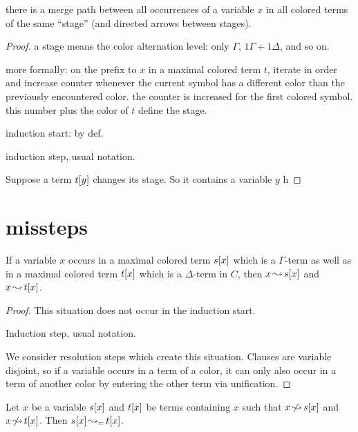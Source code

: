 \documentclass[,%
	paper=a4,%
	DIV11, %
	twoside=false,%
	liststotoc,
	bibtotoc,
	draft=false,%
	numbers=noendperiod
]{scrartcl}
\begin{document}
\begin{clemma}
	there is a merge path between all occurrences of a variable $x$ in all colored terms of the same ``stage'' (and directed arrows between stages).
\end{clemma}
\begin{proof}
	a stage means the color alternation level: only $\Gamma$, $1 \Gamma + 1 \Delta$, and so on.

	more formally: on the prefix to $x$ in a maximal colored term $t$, iterate in order and increase counter whenever the current symbol has a different color than the previously encountered color. the counter is increased for the first colored symbol. this number plus the color of $t$ define the stage.

	induction start: by def.

	induction step, usual notation.

	Suppose a term $t[y]$ changes its stage. 
	So it contains a variable $y$ h





\end{proof}



\section{missteps}
\begin{clemma}
	\label{lemma:arrow_from_one_color_to_other_color}
	If a variable $x$ occurs in a maximal colored term $s[x]$ which is a $\Gamma$-term as well as in a maximal colored term $t[x]$ which is a $\Delta$-term in $C$, then $x\operatorname{\leadsto} s[x]$ and $x\operatorname{\leadsto} t[x]$.
\end{clemma}
\begin{proof}
	This situation does not occur in the induction start.

	Induction step, usual notation.

	We consider resolution steps which create this situation. 
	Clauses are variable disjoint, so if a variable occurs in a term of a color, it can only also occur in a term of another color by entering the other term via unification.

\end{proof}


\begin{clemma}
	\label{wrong:same_color2}
	Let $x$ be a variable $s[x]$ and $t[x]$ be terms containing $x$ such that $x\operatorname{\not\leadsto} s[x]$ and $x\operatorname{\not\leadsto} t[x]$.
	\label{lemma:merge_arrow_between_same_colored_terms}
	Then $s[x] \operatorname{\leadsto_=} t[x]$.
\end{clemma}
\end{document}
